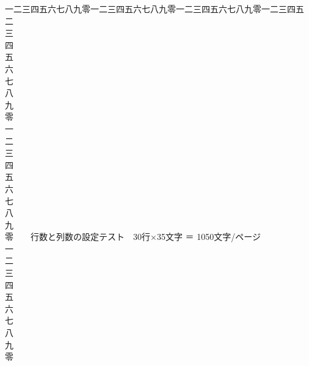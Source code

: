 \clearpage
\noindent
一二三四五六七八九零一二三四五六七八九零一二三四五六七八九零一二三四五\\
二\\
三\\
四\\
五\\
六\\
七\\
八\\
九\\
零\\
一\\
二\\
三\\
四\\
五\\
六\\
七\\
八\\
九\\
零　　行数と列数の設定テスト　30行×35文字 ＝ 1050文字/ページ\\
一\\
二\\
三\\
四\\
五\\
六\\
七\\
八\\
九\\
零
